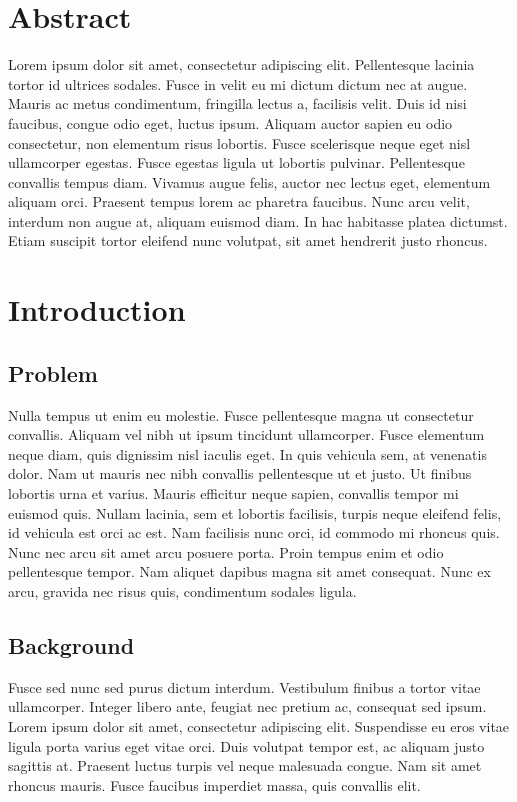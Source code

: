 



\chapter{Abstract}
Lorem ipsum dolor sit amet, consectetur adipiscing elit. Pellentesque lacinia tortor id ultrices sodales. Fusce in velit eu mi dictum dictum nec at augue. Mauris ac metus condimentum, fringilla lectus a, facilisis velit. Duis id nisi faucibus, congue odio eget, luctus ipsum. Aliquam auctor sapien eu odio consectetur, non elementum risus lobortis. Fusce scelerisque neque eget nisl ullamcorper egestas. Fusce egestas ligula ut lobortis pulvinar. Pellentesque convallis tempus diam. Vivamus augue felis, auctor nec lectus eget, elementum aliquam orci. Praesent tempus lorem ac pharetra faucibus. Nunc arcu velit, interdum non augue at, aliquam euismod diam. In hac habitasse platea dictumst. Etiam suscipit tortor eleifend nunc volutpat, sit amet hendrerit justo rhoncus.


\chapter{Introduction}

\section{Problem} 
Nulla tempus ut enim eu molestie. Fusce pellentesque magna ut consectetur convallis. Aliquam vel nibh ut ipsum tincidunt ullamcorper. Fusce elementum neque diam, quis dignissim nisl iaculis eget. In quis vehicula sem, at venenatis dolor. Nam ut mauris nec nibh convallis pellentesque ut et justo. Ut finibus lobortis urna et varius. Mauris efficitur neque sapien, convallis tempor mi euismod quis. Nullam lacinia, sem et lobortis facilisis, turpis neque eleifend felis, id vehicula est orci ac est. Nam facilisis nunc orci, id commodo mi rhoncus quis. Nunc nec arcu sit amet arcu posuere porta. Proin tempus enim et odio pellentesque tempor. Nam aliquet dapibus magna sit amet consequat. Nunc ex arcu, gravida nec risus quis, condimentum sodales ligula.

\section{Background}
Fusce sed nunc sed purus dictum interdum. Vestibulum finibus a tortor vitae ullamcorper. Integer libero ante, feugiat nec pretium ac, consequat sed ipsum. Lorem ipsum dolor sit amet, consectetur adipiscing elit. Suspendisse eu eros vitae ligula porta varius eget vitae orci. Duis volutpat tempor est, ac aliquam justo sagittis at. Praesent luctus turpis vel neque malesuada congue. Nam sit amet rhoncus mauris. Fusce faucibus imperdiet massa, quis convallis elit.

